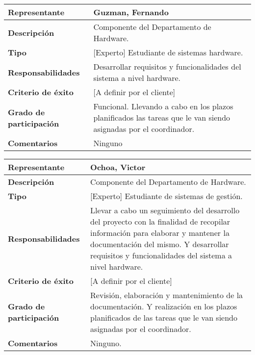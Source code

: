        \begin{tabular}{|p{4cm}|p{12cm}|}
            \hline \textbf{Representante} & Guzman, Fernando \\
            \hline \textbf{Descripción} & Componente del Departamento de Hardware. \\
            \hline \textbf{Tipo} & [Experto] Estudiante de sistemas hardware. \\
            \hline \textbf{Responsabilidades} & Desarrollar requisitos y funcionalidades del sistema a nivel hardware. \\
            \hline \textbf{Criterio de éxito} & [A definir por el cliente] \\
            \hline \textbf{Grado de participación} & Funcional. Llevando a cabo en los plazos planificados las tareas que le van siendo asignadas por el coordinador. \\
            \hline \textbf{Comentarios} &  Ninguno \\
            \hline
        \end{tabular}
        
		\begin{tabular}{|p{4cm}|p{12cm}|}
            \hline \textbf{Representante} & Ochoa, Victor \\
            \hline \textbf{Descripción} & Componente del Departamento de Hardware. \\
            \hline \textbf{Tipo} & [Experto] Estudiante de sistemas de gestión. \\
            \hline \textbf{Responsabilidades} & Llevar a cabo un seguimiento del desarrollo del proyecto con la finalidad de recopilar información para elaborar y mantener la documentación del mismo. Y desarrollar requisitos y funcionalidades del sistema a nivel hardware. \\
            \hline \textbf{Criterio de éxito} & [A definir por el cliente] \\
            \hline \textbf{Grado de participación} & Revisión, elaboración y mantenimiento de la documentación. Y realización en los plazos planificados de las tareas que le van siendo asignadas por el coordinador. \\
            \hline \textbf{Comentarios} &  Ninguno. \\
            \hline
        \end{tabular}

